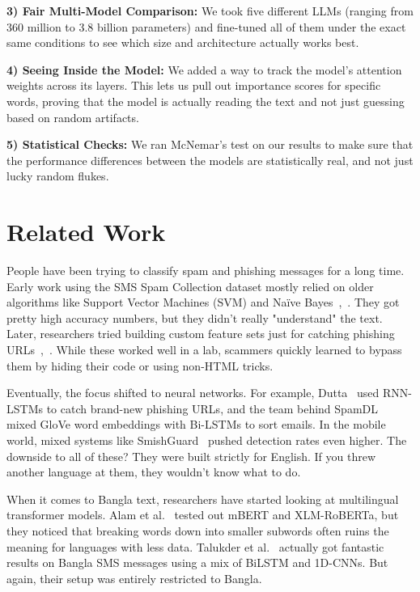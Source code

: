\documentclass[journal]{IEEEtran}
\begin{document}
\textbf{3) Fair Multi-Model Comparison:} We took five different LLMs (ranging from 360 million to 3.8 billion parameters) and fine-tuned all of them under the exact same conditions to see which size and architecture actually works best.

\textbf{4) Seeing Inside the Model:} We added a way to track the model's attention weights across its layers. This lets us pull out importance scores for specific words, proving that the model is actually reading the text and not just guessing based on random artifacts.

\textbf{5) Statistical Checks:} We ran McNemar's test on our results to make sure that the performance differences between the models are statistically real, and not just lucky random flukes.



\section{Related Work}

People have been trying to classify spam and phishing messages for a long time. Early work using the SMS Spam Collection dataset mostly relied on older algorithms like Support Vector Machines (SVM) and Naïve Bayes~\cite{ref1},~\cite{ref5}. They got pretty high accuracy numbers, but they didn't really "understand" the text. Later, researchers tried building custom feature sets just for catching phishing URLs~\cite{ref2},~\cite{ref8}. While these worked well in a lab, scammers quickly learned to bypass them by hiding their code or using non-HTML tricks.

Eventually, the focus shifted to neural networks. For example, Dutta~\cite{ref3} used RNN-LSTMs to catch brand-new phishing URLs, and the team behind SpamDL~\cite{ref9} mixed GloVe word embeddings with Bi-LSTMs to sort emails. In the mobile world, mixed systems like SmishGuard~\cite{ref6} pushed detection rates even higher. The downside to all of these? They were built strictly for English. If you threw another language at them, they wouldn't know what to do.

When it comes to Bangla text, researchers have started looking at multilingual transformer models. Alam et al.~\cite{ref4} tested out mBERT and XLM-RoBERTa, but they noticed that breaking words down into smaller subwords often ruins the meaning for languages with less data. Talukder et al.~\cite{ref7} actually got fantastic results on Bangla SMS messages using a mix of BiLSTM and 1D-CNNs. But again, their setup was entirely restricted to Bangla.
\end{document}
